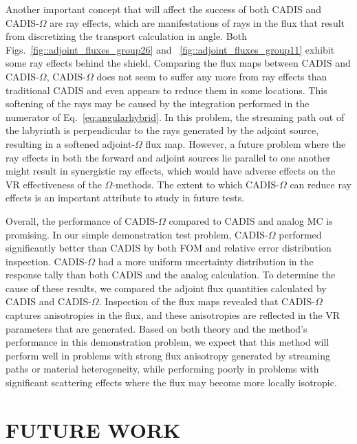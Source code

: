 \documentclass[12pt]{article}
\begin{document}
Another important concept that will affect the success of both CADIS and CADIS-$\Omega$ are ray effects, which are manifestations of rays in the flux that result from discretizing the transport calculation in angle. Both Figs.~\ref{fig::adjoint_fluxes_group26} and ~\ref{fig::adjoint_fluxes_group11} exhibit some ray effects behind the shield. Comparing the flux maps between CADIS and  CADIS-$\Omega$, CADIS-$\Omega$ does not seem to suffer any more from ray effects than traditional CADIS and even appears to reduce them in some locations. This softening of the rays may be caused by the integration performed in the numerator of Eq.~\eqref{eq:angularhybrid}. In this problem, the streaming path out of the labyrinth is perpendicular to the rays generated by the adjoint source, resulting in a softened adjoint-$\Omega$ flux map. However, a future problem where the ray effects in both the forward and adjoint sources lie parallel to one another might result in synergistic ray effects, which would have adverse effects on the VR effectiveness of the $\Omega$-methods. The extent to which CADIS-$\Omega$ can reduce ray effects is an important attribute to study in future tests.

Overall, the performance of CADIS-$\Omega$ compared to CADIS and analog MC is promising. In our simple demonstration test problem, CADIS-$\Omega$ performed significantly better than CADIS by both FOM and relative error distribution inspection. CADIS-$\Omega$ had a more uniform uncertainty distribution in the response tally than both CADIS and the analog calculation. To determine the cause of these results, we compared the adjoint flux quantities calculated by CADIS and CADIS-$\Omega$. Inspection of the flux maps revealed that CADIS-$\Omega$ captures anisotropies in the flux, and these anisotropies are reflected in the VR parameters that are generated. Based on both theory and the method's performance in this demonstration problem, we expect that this method will perform well in problems with strong flux anisotropy generated by streaming paths or material heterogeneity, while performing poorly in problems with significant scattering effects where the flux may become more locally isotropic. 
 


%
\section{FUTURE WORK} 
\label{sect::future}
 
\end{document}
